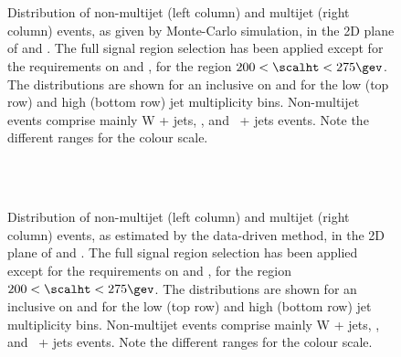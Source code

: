 \begin{figure}[!h]
  \centering
   \\
   \\
  \caption{Distribution of non-multijet (left column) and multijet
    (right column) events, as given by Monte-Carlo simulation, in the
    2D plane of \mhtmet and \alphat. The full signal region selection
    has been applied except for the requirements on \mhtmet and
    \alphat, for the region $200 < \scalht < 275\gev$. The
    distributions are shown for an inclusive on \nb and for the low
    (top row) and high (bottom row) jet multiplicity
    bins. Non-multijet events comprise mainly W + jets, \ttbar, and
    \znunu\ + jets events. Note the different ranges for the colour
    scale.} 
  \label{fig:}
\end{figure}

\begin{figure}[!h]
  \centering
   \\
   \\
  \caption{Distribution of non-multijet (left column) and multijet
    (right column) events, as estimated by the data-driven method, in
    the 2D plane of \mhtmet and \alphat. The full signal region
    selection has been applied except for the requirements on \mhtmet
    and \alphat, for the region $200 < \scalht < 275\gev$. The
    distributions are shown for an inclusive on \nb and for the low 
    (top row) and high (bottom row) jet multiplicity
    bins. Non-multijet events comprise mainly W + jets, \ttbar, and
    \znunu\ + jets events. Note the different ranges for the colour
    scale.}
  \label{fig:}
\end{figure}

